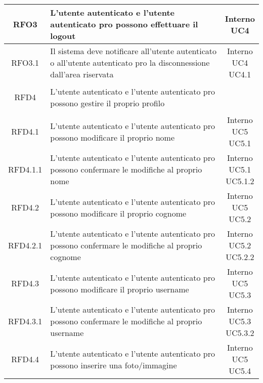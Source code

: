 \begin{longtable}{|c|>{\centering}m{7cm}|c|}
			 \hypertarget{{RFO3}}{{RFO3}} & L’utente autenticato e l’utente autenticato pro possono effettuare il logout & \makecell{Interno\\ UC4 } \\ \hline
			 \hypertarget{{RFO3.1}}{{RFO3.1}} & Il sistema deve notificare all’utente autenticato o all’utente autenticato pro la disconnessione dall’area riservata & \makecell{Interno\\ UC4 \\UC4.1 } \\ \hline
			 \hypertarget{{RFD4}}{{RFD4}} & L’utente autenticato e l’utente autenticato pro possono gestire il proprio profilo & \makecell{Interno } \\ \hline
			 \hypertarget{{RFD4.1}}{{RFD4.1}} & L’utente autenticato e l’utente autenticato pro possono modificare il proprio nome  & \makecell{Interno\\ UC5 \\UC5.1 } \\ \hline
			 \hypertarget{{RFD4.1.1}}{{RFD4.1.1}} & L’utente autenticato e l’utente autenticato pro possono confermare le modifiche al proprio nome & \makecell{Interno\\ UC5.1 \\UC5.1.2 } \\ \hline
			 \hypertarget{{RFD4.2}}{{RFD4.2}} & L’utente autenticato e l’utente autenticato pro possono modificare il proprio cognome  & \makecell{Interno\\ UC5 \\UC5.2 } \\ \hline
			 \hypertarget{{RFD4.2.1}}{{RFD4.2.1}} & L’utente autenticato e l’utente autenticato pro possono confermare le modifiche al proprio cognome & \makecell{Interno\\ UC5.2 \\UC5.2.2 } \\ \hline
			 \hypertarget{{RFD4.3}}{{RFD4.3}} & L’utente autenticato e l’utente autenticato pro possono modificare il proprio username & \makecell{Interno\\ UC5 \\UC5.3 } \\ \hline
			 \hypertarget{{RFD4.3.1}}{{RFD4.3.1}} &  L’utente autenticato e l’utente autenticato pro possono confermare le modifiche al proprio username & \makecell{Interno\\ UC5.3 \\UC5.3.2 } \\ \hline
			 \hypertarget{{RFD4.4}}{{RFD4.4}} & L’utente autenticato e l’utente autenticato pro possono inserire una foto/immagine  & \makecell{Interno\\ UC5 \\UC5.4 } \\ \hline

\end{longtable}
